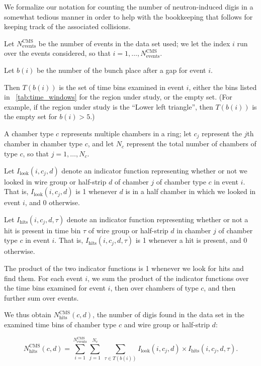 We formalize our notation for counting the number of neutron-induced
digis in a somewhat tedious manner in order to help with the
bookkeeping that follows for keeping track of the associated \pp
collisions.

Let $N_\text{events}^\text{CMS}$ be the number of events in the data
set used; we let the index $i$ run over the events considered, so that
$i=1, \ldots, N^{\text{CMS}}_{\text{events}}$.

Let $b(i)$ be the number of the bunch place after a gap for event $i$.

Then $T(b(i))$ is the set of time bins examined in event $i$, either
the bins listed in \Tab~\ref{tab:time_windows} for the region under
study, or the empty set.  (For example, if the region under study is
the ``Lower left triangle'', then $T(b(i))$ is the empty set for $b(i)
> 5$.)

A chamber type $c$ represents multiple chambers in a ring; let $c_j$
represent the $j$th chamber in chamber type $c$, and let $N_c$
represent the total number of chambers of type $c$, so that
$j=1, \ldots, N_{c}$.


Let $I_\text{look}(i, c_j, d)$ denote an indicator function
representing whether or not we looked in wire group or half-strip $d$
of chamber $j$ of chamber type $c$ in event $i$.  That is,
$I_\text{look}(i, c_j, d)$ is 1 whenever $d$ is in a half chamber in
which we looked in event $i$, and 0 otherwise.


Let $I_\text{hits}(i, c_j, d, \tau)$ denote an indicator function
representing whether or not a hit is present in time bin $\tau$ of
wire group or half-strip $d$ in chamber $j$ of chamber type $c$ in
event $i$.  That is, $I_\text{hits}(i, c_j, d, \tau)$ is 1 whenever a
hit is present, and 0 otherwise.

The product of the two indicator functions is 1 whenever we look for
hits and find them.  For each event $i$, we sum the product of the
indicator functions over the time bins examined for event $i$, then
over chambers of type $c$, and then further sum over events.

We thus obtain $N_\text{hits}^\text{CMS}(c, d)$, the number of digis
found in the data set in the examined time bins of chamber type $c$
and wire group or half-strip $d$:

\begin{equation}
	\label{eqn:indicator_nHits}
	N_\text{hits}^\text{CMS}(c, d) = 
        \sum_{i=1}^{N^\text{CMS}_\text{events}}
        \sum_{j=1}^{N_c} \ 
        \sum_{\tau\in T(b(i))}
        I_\text{look}(i, c_j, d) \times
        I_\text{hits}(i, c_j, d, \tau). 
\end{equation}

